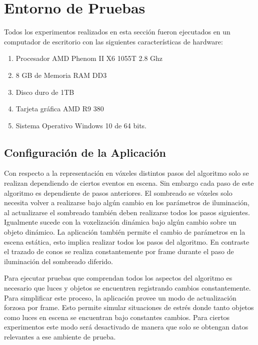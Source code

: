 \section{Entorno de Pruebas}
Todos los experimentos realizados en esta sección fueron ejecutados en un computador de escritorio con las siguientes características de hardware:

\begin{enumerate}
    \item Procesador AMD Phenom II X6 1055T 2.8 Ghz
    \item 8 GB de Memoria RAM DD3
    \item Disco duro de 1TB 
    \item Tarjeta gráfica AMD R9 380
    \item Sistema Operativo Windows 10 de 64 bits.
\end{enumerate}

\subsection{Configuración de la Aplicación}

Con respecto a la representación en vóxeles distintos pasos del algoritmo solo se realizan dependiendo de ciertos eventos en escena. Sin embargo cada paso de este algoritmo es dependiente de pasos anteriores. El sombreado se vóxeles solo necesita volver a realizarse bajo algún cambio en los parámetros de iluminación, al actualizarse el sombreado también deben realizarse todos los pasos siguientes. Igualmente sucede con la voxelización dinámica bajo algún cambio sobre un objeto dinámico. La aplicación también permite el cambio de parámetros en la escena estática, esto implica realizar todos los pasos del algoritmo. En contraste el trazado de conos se realiza constantemente por frame durante el paso de iluminación del sombreado diferido.

Para ejecutar pruebas que comprendan todos los aspectos del algoritmo es necesario que luces y objetos se encuentren registrando cambios constantemente. Para simplificar este proceso, la aplicación provee un modo de actualización forzosa por frame. Esto permite simular situaciones de estrés donde tanto objetos como luces en escena se encuentran bajo constantes cambios. Para ciertos experimentos este modo será desactivado de manera que solo se obtengan datos relevantes a ese ambiente de prueba.
